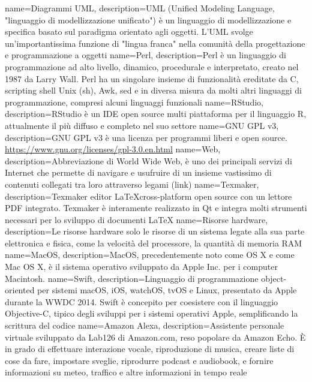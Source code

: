  {
	name=Diagrammi UML,
	description={UML (Unified Modeling Language, "linguaggio di modellizzazione unificato") è un linguaggio di modellizzazione e specifica basato sul paradigma orientato agli oggetti. L'UML svolge un'importantissima funzione di "lingua franca" nella comunità della progettazione e programmazione a oggetti}
}
 {
	name=Perl,
	description={Perl è un linguaggio di programmazione ad alto livello, dinamico, procedurale e interpretato, creato nel 1987 da Larry Wall. Perl ha un singolare insieme di funzionalità ereditate da C, scripting shell Unix (sh), Awk, sed e in diversa misura da molti altri linguaggi di programmazione, compresi alcuni linguaggi funzionali}
}
 {
	name=RStudio,
	description={RStudio è un IDE open source multi piattaforma per il linguaggio R, attualmente il più diffuso e completo nel suo settore}
}
 {
	name=GNU GPL v3,
	description={GNU GPL v3 è una licenza per programmi liberi e open source. \url{https://www.gnu.org/licenses/gpl-3.0.en.html}}
}
 {
	name=Web,
	description={Abbreviazione di World Wide Web, è uno dei principali servizi di Internet che permette di navigare e usufruire di un insieme vastissimo di contenuti collegati tra loro attraverso legami (link)}
}
 {
	name=Texmaker,
	description={Texmaker editor \LaTeX cross-platform open source con un lettore PDF integrato. Texmaker è interamente realizzato in Qt e integra molti strumenti necessari per lo sviluppo di documenti \LaTeX}
}
 {
	name=Risorse hardware,
	description={Le risorse hardware solo le risorse di un sistema legate alla sua parte elettronica e fisica, come la velocità del processore, la quantità di memoria RAM}
}
 {
	name=MacOS,
	description={MacOS, precedentemente noto come OS X e come Mac OS X, è il sistema operativo sviluppato da Apple Inc. per i computer Macintosh. }
}
 {
	name=Swift,
	description={Linguaggio di programmazione object-oriented per sistemi macOS, iOS, watchOS, tvOS e Linux, presentato da Apple durante la WWDC 2014. Swift è concepito per coesistere con il linguaggio Objective-C, tipico degli sviluppi per i sistemi operativi Apple, semplificando la scrittura del codice}
}
 {
	name=Amazon Alexa,
	description={Assistente personale virtuale sviluppato da Lab126 di Amazon.com, reso popolare da Amazon Echo. È in grado di effettuare interazione vocale, riproduzione di musica, creare liste di cose da fare, impostare sveglie, riprodurre podcast e audiobook, e fornire informazioni su meteo, traffico e altre informazioni in tempo reale}
}
